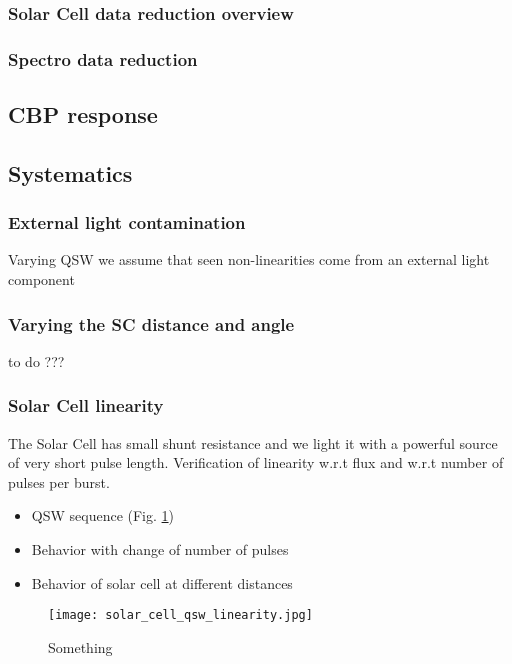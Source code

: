 \documentclass[onecolumn]{aa}
\begin{document}
\subsubsection{Solar Cell data reduction overview}

\subsubsection{Spectro data reduction}


\subsection{CBP response}

\subsection{Systematics}


\subsubsection{External light contamination}

Varying QSW we assume that seen non-linearities come from an external light component

\subsubsection{Varying the SC distance and angle}

to do ???


\subsubsection{Solar Cell linearity}

The Solar Cell has small shunt resistance and we light it with a powerful source
of very short pulse length. Verification of linearity w.r.t flux and w.r.t
number of pulses per burst. 


\begin{itemize}
  \item QSW sequence  (Fig. \ref{fig:SCqswlinearity})
  \item Behavior with change of number of pulses
  \item Behavior of solar cell at different distances
\end{itemize}


\begin{figure}[!ht]
\begin{center}
\texttt{[image: solar\_cell\_qsw\_linearity.jpg]}
\end{center}
\caption[]{Something}
\label{fig:SCqswlinearity}
\end{figure}
\end{document}
